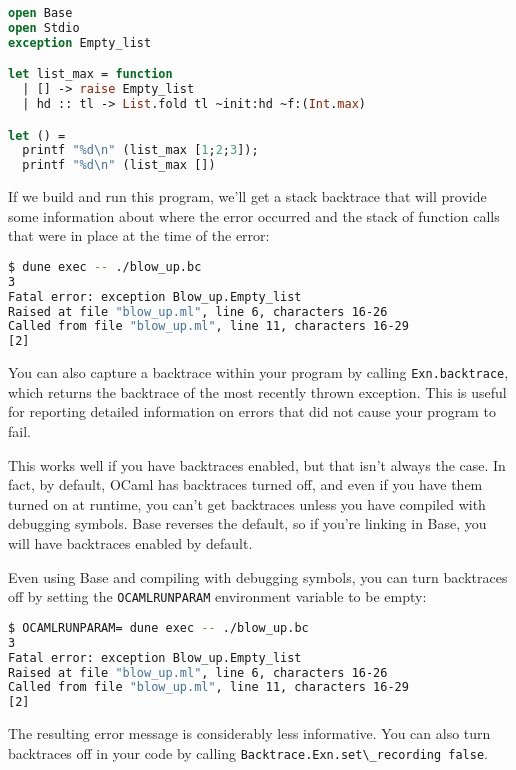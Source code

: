 \begin{lstlisting}[language=Caml]
open Base
open Stdio
exception Empty_list

let list_max = function
  | [] -> raise Empty_list
  | hd :: tl -> List.fold tl ~init:hd ~f:(Int.max)

let () =
  printf "%d\n" (list_max [1;2;3]);
  printf "%d\n" (list_max [])
\end{lstlisting}

If we build and run this program, we'll get a stack backtrace that will
provide some information about where the error occurred and the stack of
function calls that were in place at the time of the error:

\begin{lstlisting}[language=bash]
$ dune exec -- ./blow_up.bc
3
Fatal error: exception Blow_up.Empty_list
Raised at file "blow_up.ml", line 6, characters 16-26
Called from file "blow_up.ml", line 11, characters 16-29
[2]
\end{lstlisting}

You can also capture a backtrace within your program by calling
\passthrough{\lstinline!Exn.backtrace!}, which returns the backtrace of
the most recently thrown exception. This is useful for reporting
detailed information on errors that did not cause your program to
fail.

This works well if you have backtraces enabled, but that isn't always
the case. In fact, by default, OCaml has backtraces turned off, and even
if you have them turned on at runtime, you can't get backtraces unless
you have compiled with debugging symbols. Base reverses the default, so
if you're linking in Base, you will have backtraces enabled by default.

Even using Base and compiling with debugging symbols, you can turn
backtraces off by setting the \passthrough{\lstinline!OCAMLRUNPARAM!}
environment variable to be empty:

\begin{lstlisting}[language=bash]
$ OCAMLRUNPARAM= dune exec -- ./blow_up.bc
3
Fatal error: exception Blow_up.Empty_list
Raised at file "blow_up.ml", line 6, characters 16-26
Called from file "blow_up.ml", line 11, characters 16-29
[2]
\end{lstlisting}

The resulting error message is considerably less informative. You can
also turn backtraces off in your code by calling
\passthrough{\lstinline!Backtrace.Exn.set\_recording false!}.

